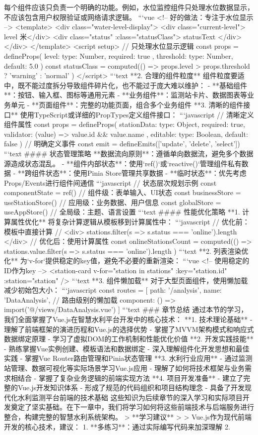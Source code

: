 每个组件应该只负责一个明确的功能。例如，水位监控组件只处理水位数据显示，不应该包含用户权限验证或网络请求逻辑。 ```vue <!-- 好的做法：专注于水位显示 --> <template> <div class="water-level-display"> <div class="current-level">{{ level }} 米</div> <div class="status" :class="statusClass">{{ statusText }}</div> </div> </template> <script setup> // 只处理水位显示逻辑 const props = defineProps({ level: { type: Number, required: true }, threshold: { type: Number, default: 5.0 } }) const statusClass = computed(() => props.level > props.threshold ? 'warning' : 'normal' ) </script> ```text **2. 合理的组件粒度** 组件粒度要适中，既不能过度拆分导致组件碎片化，也不能过于庞大难以维护： - **基础组件**：按钮、输入框、图标等通用元素 - **业务组件**：监测站卡片、数据图表等业务单元 - **页面组件**：完整的功能页面，组合多个业务组件 **3. 清晰的组件接口** 使用TypeScript或详细的PropTypes定义组件接口： ```javascript // 清晰定义组件属性 const props = defineProps({ stationData: { type: Object, required: true, validator: (value) => value.id && value.name }, editable: { type: Boolean, default: false } }) // 明确定义事件 const emit = defineEmits(['update', 'delete', 'select']) ```text #### 状态管理策略 **数据流向原则**：遵循单向数据流，避免多个数据源造成状态混乱。 - **组件内部状态**：使用`ref()`或`reactive()`管理组件私有数据 - **跨组件状态**：使用Pinia Store管理共享数据 - **临时状态**：优先考虑Props/Events进行组件间通信 ```javascript // 状态层次规划示例 const componentState = ref({}) // 组件级：表单输入、UI状态 const businessStore = useStationStore() // 应用级：业务数据、用户信息 const globalStore = useAppStore() // 全局级：主题、语言设置 ```text #### 性能优化策略 **1. 计算属性优化** 将复杂计算逻辑从模板移到计算属性中： ```javascript // 优化前：模板中直接计算 // <div>{{ stations.filter(s => s.status === 'online').length }}</div> // 优化后：使用计算属性 const onlineStationsCount = computed(() => stations.value.filter(s => s.status === 'online').length ) ```text **2. 列表渲染优化** 为`v-for`提供稳定的key值，避免不必要的重新渲染： ```vue <!-- 使用稳定的ID作为key --> <station-card v-for="station in stations" :key="station.id" :station="station" /> ```text **3. 组件懒加载** 对于大型页面组件，使用懒加载减少初始包大小： ```javascript const routes = [ { path: '/analysis', name: 'DataAnalysis', // 路由级别的懒加载 component: () => import('@/views/DataAnalysis.vue') } ] ```text ### 章节总结 通过本节的学习，我们全面掌握了Vue.js在智慧水利平台开发中的核心技术： **1. 技术理论基础** - 理解了前端框架的演进历程和Vue.js的选择优势 - 掌握了MVVM架构模式和响应式数据绑定原理 - 学习了虚拟DOM的工作机制和性能优化价值 **2. 开发实践技能** - 熟练掌握Vue实例创建、模板语法和数据绑定 - 深入理解组件化开发思想和最佳实践 - 掌握Vue Router路由管理和Pinia状态管理 **3. 水利行业应用** - 通过监测站管理、数据可视化等实际场景学习Vue.js应用 - 理解了如何将技术框架与业务需求相结合 - 掌握了复杂业务逻辑的前端实现方法 **4. 项目开发准备** - 建立了完整的Vue.js开发知识体系 - 形成了规范的代码组织和项目结构理念 - 具备了开发现代化水利监测平台前端的技术基础 这些知识为后续章节的深入学习和实际项目开发奠定了坚实基础。在下一章中，我们将学习如何将这些前端技术与后端服务进行整合，构建完整的智慧水利系统架构。 > **学习建议** > > Vue.js作为现代前端开发的核心技术，建议： 1. **多练习**：通过实际编写代码来加深理解 2. 